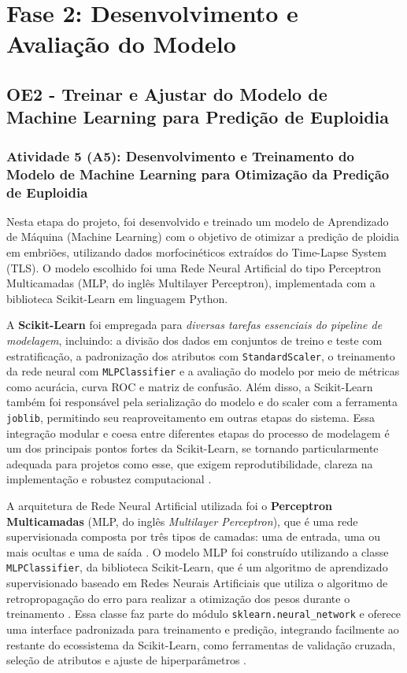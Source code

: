 \section{Fase 2: Desenvolvimento e Avaliação do Modelo}
\subsection{OE2 - Treinar e Ajustar do Modelo de Machine Learning para Predição de Euploidia}
\subsubsection{Atividade 5 (A5): Desenvolvimento e Treinamento do Modelo de Machine Learning para Otimização da Predição de Euploidia}
Nesta etapa do projeto, foi desenvolvido e treinado um modelo de Aprendizado de Máquina (Machine Learning) com o objetivo de otimizar a predição de ploidia em embriões, utilizando dados morfocinéticos extraídos do Time-Lapse System (TLS). O modelo escolhido foi uma Rede Neural Artificial do tipo Perceptron Multicamadas (MLP, do inglês Multilayer Perceptron), implementada com a biblioteca Scikit-Learn em linguagem Python.

A \textbf{Scikit-Learn} foi empregada para \textit{diversas tarefas essenciais do pipeline de modelagem}, incluindo: a divisão dos dados em conjuntos de treino e teste com estratificação, a padronização dos atributos com \texttt{StandardScaler}, o treinamento da rede neural com \texttt{MLPClassifier} e a avaliação do modelo por meio de métricas como acurácia, curva ROC e matriz de confusão. Além disso, a Scikit-Learn também foi responsável pela serialização do modelo e do scaler com a ferramenta \texttt{joblib}, permitindo seu reaproveitamento em outras etapas do sistema. Essa integração modular e coesa entre diferentes etapas do processo de modelagem é um dos principais pontos fortes da Scikit-Learn, se tornando particularmente adequada para projetos como esse, que exigem reprodutibilidade, clareza na implementação e robustez computacional \cite{geron2017}.

A arquitetura de Rede Neural Artificial utilizada foi o \textbf{Perceptron Multicamadas} (MLP, do inglês \textit{Multilayer Perceptron}), que é uma rede supervisionada composta por três tipos de camadas: uma de entrada, uma ou mais ocultas e uma de saída \cite{haykin2009}. O modelo MLP foi construído utilizando a classe \texttt{MLPClassifier}, da biblioteca Scikit-Learn, que é um algoritmo de aprendizado supervisionado baseado em Redes Neurais Artificiais que utiliza o algoritmo de retropropagação do erro para realizar a otimização dos pesos durante o treinamento \cite{geron2017}.  Essa classe faz parte do módulo \texttt{sklearn.neural\_network} e oferece uma interface padronizada para treinamento e predição, integrando facilmente ao restante do ecossistema da Scikit-Learn, como ferramentas de validação cruzada, seleção de atributos e ajuste de hiperparâmetros \cite{geron2017}. 


